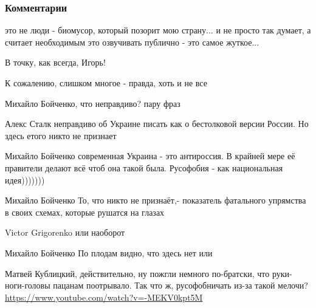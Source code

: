 
 
 
 
 
\subsubsection{Комментарии}
\label{sec:20_06_2021.fb.lesev_igor.1.bog_danilova_krym.cmt}

\begin{itemize}

это не люди - биомусор, который позорит мою страну... и не просто так думает, а
считает необходимым это озвучивать публично - это самое жуткое...


В точку, как всегда, Игорь!


К сожалению, слишком многое - правда, хоть и не все

\begin{itemize}

Михайло Бойченко, что неправдиво? пару фраз


Алекс Сталк неправдиво об Украине писать как о бестолковой версии России. Но здесь етого никто не признает


Михайло Бойченко современная Украина - это антироссия. В крайней мере её правители делают всё чтоб она такой была. Русофобия - как национальная идея)))))))


Михайло Бойченко То, что никто не признаёт,- показатель фатального упрямства в своих схемах, которые рушатся на глазах


Victor Grigorenko или наоборот


Михайло Бойченко По плодам видно, что здесь нет или

Матвей Кублицкий, действительно, ну пожгли немного по-братски, что
руки-ноги-головы пацанам поотрывало. Так что ж, русофобничать из-за такой
мелочи? \url{https://www.youtube.com/watch?v=-MEKV0kpt5M}
\end{itemize}


\end{itemize}
